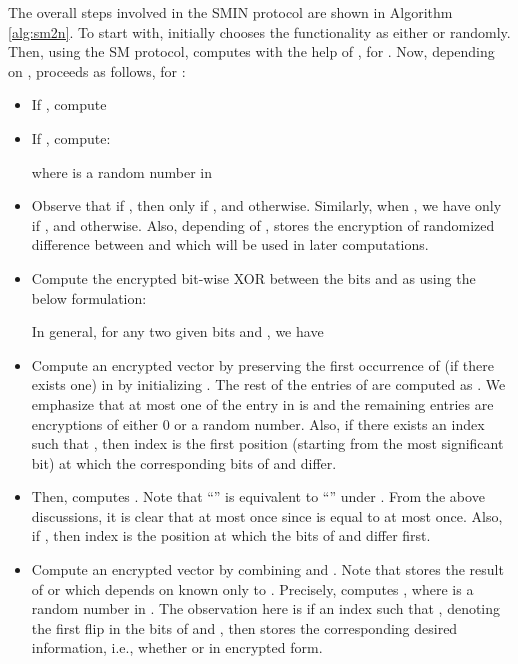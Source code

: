 \documentclass{article}
\begin{document}
The overall steps involved in the SMIN protocol are shown in 
Algorithm \ref{alg:sm2n}. To start with,  initially 
chooses the functionality  as either  or  
randomly. Then, using the SM protocol,  computes  
with the help of , for . Now, depending on , 
 proceeds as follows, for :
\begin{itemize}
\item If , compute

\item If , compute:

where  is a random number in 
\item Observe that if , then  only if , 
and  otherwise. Similarly, when , we have  only 
if , and  otherwise. Also, depending of ,  stores the encryption of 
randomized difference between  and  which will be used in later computations. 
\item Compute the encrypted bit-wise XOR 
between the bits  and  as   using the 
below formulation:
\begin{center}
\end{center} In general, for any two given bits  and , we have 

\item Compute an encrypted vector  by preserving the first occurrence of  (if there 
exists one) in  by initializing . The  
rest of the entries of  are computed as . 
We emphasize that at most one of the entry in  is  and the remaining 
entries are encryptions of either 0 or a random number. Also, if there exists an index 
 such that , then index  is the first position (starting from the most significant bit) 
at which the corresponding bits of 
 and  differ.

\item Then,  computes . Note that ``'' is 
equivalent to ``'' under . From 
the above discussions, it is clear that  at most once since  is 
equal to  at most once. Also, if , then index  is the position 
at which the bits of  and  differ first.
\item Compute an encrypted vector  by combining  and . Note that  stores 
the result of   or  which depends on  known only to . 
Precisely,  computes , where  is a 
random number in . The observation here is if  an index  such 
that , denoting 
the first flip in the bits of  and , then  stores the 
corresponding desired information, i.e., whether  or  in encrypted form. 
\end{itemize}
\renewcommand{\tabcolsep}{.15cm}
\end{document}
